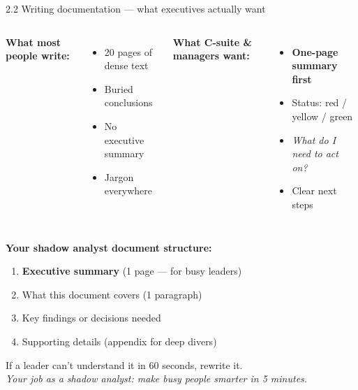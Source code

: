 \documentclass[aspectratio=169, 11pt]{beamer}
\begin{document}
	\begin{frame}{2.2 Writing documentation — what executives actually want}
		\begin{columns}[T]
			\textbf{What most people write:}
			\begin{itemize}
				\item 20 pages of dense text
				\item Buried conclusions
				\item No executive summary
				\item Jargon everywhere
			\end{itemize}
			\textbf{What C-suite \& managers want:}
			\begin{itemize}
				\item \textbf{One-page summary first}
				\item Status: red / yellow / green
				\item \textit{What do I need to act on?}
				\item Clear next steps
			\end{itemize}
		\end{columns}
		\vspace{0.2cm}
		\textbf{Your shadow analyst document structure:}
		\begin{enumerate}
			\item \textbf{Executive summary} (1 page — for busy leaders)
			\item What this document covers (1 paragraph)
			\item Key findings or decisions needed
			\item Supporting details (appendix for deep divers)
		\end{enumerate}
		\alert{If a leader can't understand it in 60 seconds, rewrite it.} \\
		\textit{Your job as a shadow analyst: make busy people smarter in 5 minutes.}
	\end{frame}
	
\end{document}
